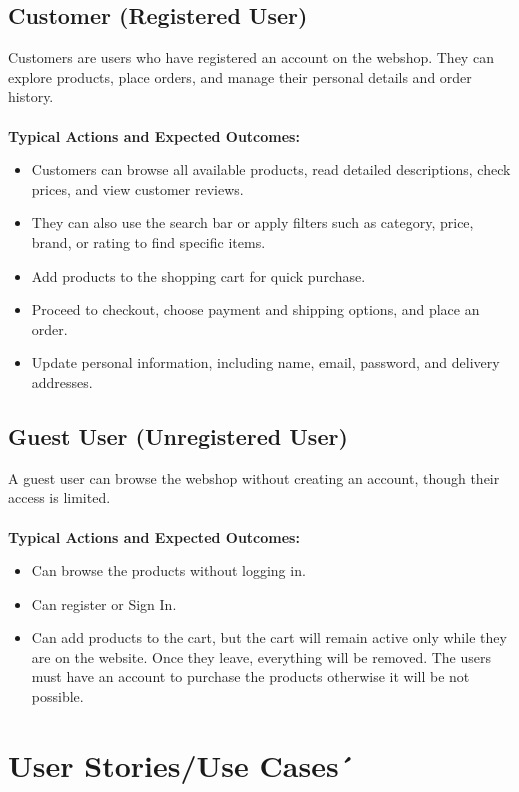 \documentclass[a4paper,12pt]{article}
\begin{document}
	\subsection*{Customer (Registered User)}
Customers are users who have registered an account on the webshop. They can explore products, place orders, and manage their personal details and order history. \\ \\
	\textbf{Typical Actions and Expected Outcomes:}
	\begin{itemize}
  		\item Customers can browse all available products, read detailed descriptions, check prices, and view customer reviews.
    		\item They can also use the search bar or apply filters such as category, price, brand, or rating to find specific items.
    		\item Add products to the shopping cart for quick purchase.
    		\item Proceed to checkout, choose payment and shipping options, and place an order.
    		\item Update personal information, including name, email, password, and delivery addresses.
	\end{itemize}

	\subsection*{Guest User (Unregistered User)}
	A guest user can browse the webshop without creating an account, though their access is limited. \\ \\
	\textbf{Typical Actions and Expected Outcomes:}
	\begin{itemize}
		\item Can browse the products without logging in.
		\item Can register or Sign In.
		\item Can add products to the cart, but the cart will remain active only while they are on the website. Once they leave, everything will be removed. The users must have an account to purchase the products otherwise it will be not possible.
	\end{itemize}
	\section{User Stories/Use Cases´}
\end{document}

